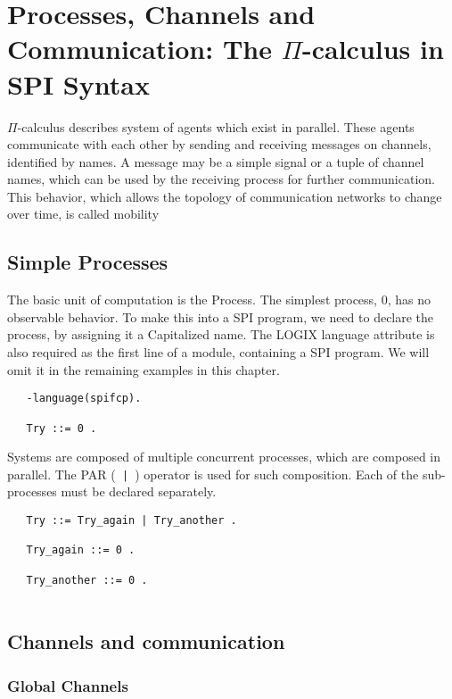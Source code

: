 \chapter{Processes, Channels and Communication: The $\Pi$-calculus in
SPI Syntax}
\label{syntax}

$\Pi$-calculus describes system of agents which exist in
parallel. These agents communicate with each other by sending and
receiving messages on channels, identified by names. A message may
be a simple signal or a tuple of channel names, which can be used by the
receiving process for further communication. This behavior, which
allows the topology of communication networks to change over time, is
called mobility

\section{Simple Processes}

The basic unit of computation is the Process. The simplest process, 0,
has no observable behavior. To make this into a SPI program, we need
to declare the process, by assigning it a Capitalized name. The LOGIX
language attribute is also required as the first line of a module,
containing a SPI program. We
will omit it in the remaining examples in this chapter.

\begin{verbatim}
   -language(spifcp).

   Try ::= 0 .

\end{verbatim}

Systems are composed of multiple concurrent processes, which are
composed in parallel. The PAR (\verb+ | +) operator is used for such
composition. Each of the sub-processes must be declared separately.

\begin{verbatim}
   Try ::= Try_again | Try_another .

   Try_again ::= 0 .

   Try_another ::= 0 .
 
\end{verbatim}

\section{Channels and communication}

\subsection{Global Channels}

